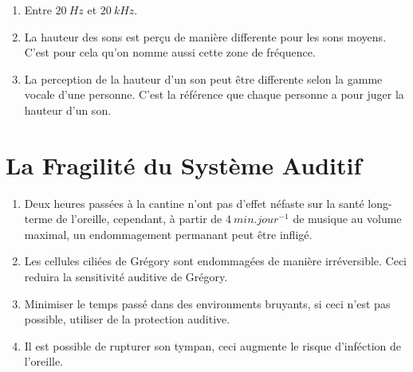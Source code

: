 \documentclass[12pt, a4paper]{article}
\begin{document}
    \begin{enumerate}[1.]
        \item	Entre $20\ \si{Hz}$ et $20\ \si{kHz}$.
        \item   La hauteur des sons est perçu de manière differente pour les sons moyens. C'est pour cela qu'on nomme aussi cette zone de fréquence.
        \item   La perception de la hauteur d'un son peut être differente selon la gamme vocale d'une personne. C'est la référence que chaque personne a pour juger la hauteur d'un son.
    \end{enumerate}

    \section{La Fragilité du Système Auditif}

    \begin{enumerate}[1.]
        \item	Deux heures passées à la cantine n'ont pas d'effet néfaste sur la santé long-terme de l'oreille, cependant, à partir de $4\ \si{min.jour^{-1}}$ de musique au volume maximal, un endommagement permanant peut être infligé.
        \item   Les cellules ciliées de Grégory sont endommagées de manière irréversible. Ceci reduira la sensitivité auditive de Grégory.
        \item   Minimiser le temps passé dans des environments bruyants, si ceci n'est pas possible, utiliser de la protection auditive.
        \item   Il est possible de rupturer son tympan, ceci augmente le risque d'inféction de l'oreille.
    \end{enumerate}
\end{document}
